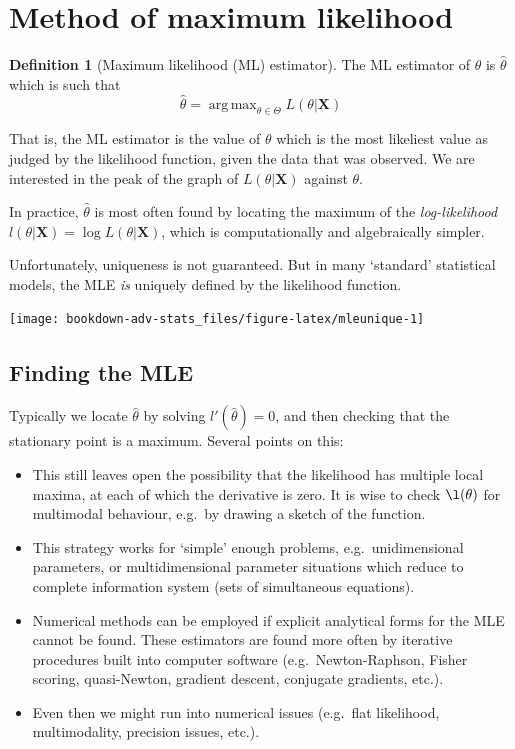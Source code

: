 \documentclass[
]{book}
\newcommand{\bX}{{\boldsymbol X}}
\DeclareMathOperator*{\argmax}{arg\,max}
\theoremstyle{definition}
\newtheorem{definition}{Definition}[chapter]
\theoremstyle{definition}
\theoremstyle{definition}
\theoremstyle{definition}
\theoremstyle{remark}
\begin{document}
\hypertarget{method-of-maximum-likelihood}{%
\section{Method of maximum likelihood}\label{method-of-maximum-likelihood}}

\begin{definition}[Maximum likelihood (ML) estimator]
The ML estimator of \(\theta\) is \(\hat\theta\) which is such that
\[
\hat\theta = \argmax_{\theta\in\Theta} L(\theta|\bX)
\]
\end{definition}

That is, the ML estimator is the value of \(\theta\) which is the most likeliest value as judged by the likelihood function, given the data that was observed.
We are interested in the peak of the graph of \(L(\theta|\bX)\) against \(\theta\).

In practice, \(\hat\theta\) is most often found by locating the maximum of the \emph{log-likelihood} \(l(\theta|\bX) = \log L(\theta|\bX)\), which is computationally and algebraically simpler.

Unfortunately, uniqueness is not guaranteed. But in many `standard' statistical models, the MLE \emph{is} uniquely defined by the likelihood function.

\begin{center}\texttt{[image: bookdown-adv-stats\_files/figure-latex/mleunique-1]} \end{center}

\hypertarget{finding-the-mle}{%
\subsection{Finding the MLE}\label{finding-the-mle}}

Typically we locate \(\hat\theta\) by solving \(l'(\hat\theta)=0\), and then checking that the stationary point is a maximum. Several points on this:

\begin{itemize}
\item
  This still leaves open the possibility that the likelihood has multiple local maxima, at each of which the derivative is zero. It is wise to check \(\l(\theta)\) for multimodal behaviour, e.g.~by drawing a sketch of the function.
\item
  This strategy works for `simple' enough problems, e.g.~unidimensional parameters, or multidimensional parameter situations which reduce to complete information system (sets of simultaneous equations).
\item
  Numerical methods can be employed if explicit analytical forms for the MLE cannot be found. These estimators are found more often by iterative procedures built into computer software (e.g.~Newton-Raphson, Fisher scoring, quasi-Newton, gradient descent, conjugate gradients, etc.).
\item
  Even then we might run into numerical issues (e.g.~flat likelihood, multimodality, precision issues, etc.).
\end{itemize}
\end{document}
